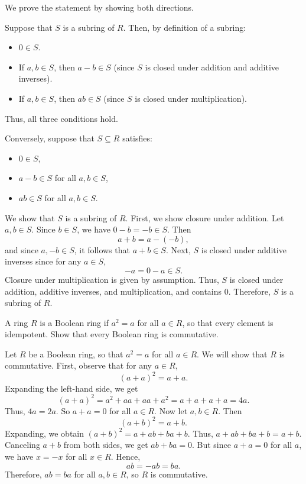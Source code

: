 \begin{solution}
  We prove the statement by showing both directions.

  Suppose that $S$ is a subring of $R$. Then, by definition of a subring:
  \begin{itemize}
    \item $0 \in S$.
    \item If $a, b \in S$, then $a-b \in S$ (since $S$ is closed under addition and additive inverses).
    \item If $a, b \in S$, then $ab \in S$ (since $S$ is closed under multiplication).
  \end{itemize}
  Thus, all three conditions hold.

  Conversely, suppose that $S \subseteq R$ satisfies:
  \begin{itemize}
    \item $0 \in S$,
    \item $a - b \in S$ for all $a, b \in S$,
    \item $ab \in S$ for all $a, b \in S$.
  \end{itemize}
  We show that $S$ is a subring of $R$. First, we show closure under addition. Let $a,b \in S$. Since $b \in S$, we have $0 - b = -b \in S$. Then
  \[%
    a + b = a - (-b)
  ,\]%
  and since $a, -b \in S$, it follows that $a + b \in S$. Next, $S$ is closed under additive inverses since for any $a \in S$,
  \[%
    -a = 0 - a \in S
  .\]%
  Closure under multiplication is given by assumption. Thus, $S$ is closed under addition, additive inverses, and multiplication, and contains $0$. Therefore, $S$ is a subring of $R$.
\end{solution}

\begin{problem}[22.57]
  A ring $R$ is a Boolean ring if $a^2 = a$ for all $a \in R$, so that every element is idempotent. Show that every Boolean ring is commutative.
\end{problem}

\begin{solution}
  Let $R$ be a Boolean ring, so that $a^2 = a$ for all $a \in R$. We will show that $R$ is commutative. First, observe that for any $a \in R$,
  \[%
    (a + a)^2 = a + a.
  \]%
  Expanding the left-hand side, we get
  \[%
    (a + a)^2 = a^2 + aa + aa + a^2 = a + a + a + a = 4a
  .\]%
  Thus, $4a = 2a$. So $a + a = 0$ for all $a \in R$. Now let $a, b \in R$. Then
  \[%
    (a + b)^2 = a + b
  .\]%
  Expanding, we obtain $(a + b)^2 = a + ab + ba + b$. Thus, $a + ab + ba + b = a + b$. Canceling $a + b$ from both sides, we get $ab + ba = 0$. But since $a + a = 0$ for all $a$, we have $x = -x$ for all $x \in R$. Hence,
  \[%
    ab = -ab = ba
  .\]%
  Therefore, $ab = ba$ for all $a,b \in R$, so $R$ is commutative.
\end{solution}

